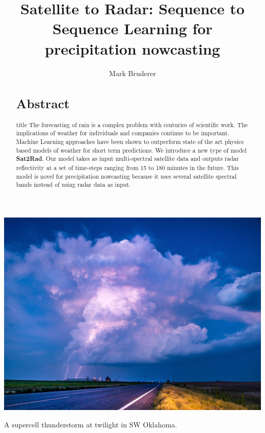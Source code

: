 \documentclass[acmtog, authorversion]{acmart}
\begin{document}
\title{Satellite to Radar: Sequence to Sequence Learning for precipitation nowcasting}

\author{Mark Bruderer}

\renewcommand{\shortauthors}{Mark Bruderer}

\begin{abstract}
\section*{Abstract}title
The forecasting of rain is a complex problem with centuries of scientific work. The implications of weather for individuals and companies continue to be important. Machine Learning approaches have been shown to outperform state of the art physics based models of weather for short term predictions. We introduce a new type of model \textbf{Sat2Rad}. Our model takes as input multi-spectral satellite data and outputs radar reflectivity at a set of time-steps ranging from 15 to 180 minutes in the future. This model is novel for precipitation nowcasting because it uses several satellite spectral bands instead of using radar data as input.
\end{abstract}



\begin{teaserfigure}
  \includegraphics*[width=\textwidth, trim=0in 0.0in 0in 16.0in]{images/lightning.jpg}
  \caption{A supercell thunderstorm at twilight in SW Oklahoma.}
  \label{fig:teaser}
\end{teaserfigure}
\end{document}
